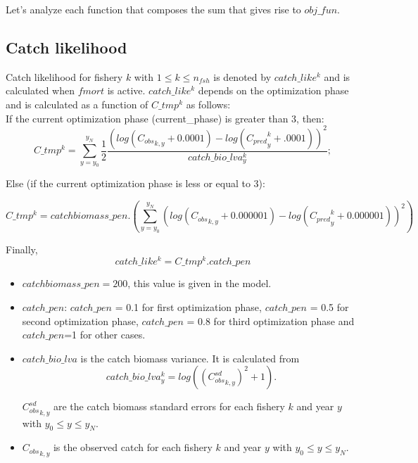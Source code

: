 \documentclass{article}
\begin{document}

Let's analyze each function that composes the sum that gives rise to $obj\_fun$.

\subsection{Catch likelihood}

Catch likelihood for fishery $k$  with  $1\leq k \leq n_{fsh}$ is denoted by $catch\_like^k$ and is calculated when $fmort$ is active.
$catch\_like^k$ depends on the optimization phase and is calculated as a function of  $C\_tmp^k$ as follows:\\

If the current optimization phase (current\_phase) is greater than 3, then:
\begin{equation}
  C\_tmp^k = \sum_{y=y_0}^{y_N}\dfrac{1}{2}\dfrac{(log({C_{obs}}_{k,y}+0.0001) - log({C_{pred}}^k_y+.0001) )^2}{catch\_bio\_lva^k_y};
\end{equation}
    
Else (if the current optimization phase is less or equal to 3):

\begin{equation}
 C\_tmp^k = catchbiomass\_pen.\left(\sum_{y=y_0}^{y_N}(log({C_{obs}}_{k,y} + 0.000001) - log({C_{pred}}^{k}_y + 0.000001))^2\right)
\end{equation}

Finally, 
\begin{equation}
 catch\_like^k = C\_tmp^k.catch\_pen 
\end{equation}
    
\begin{itemize}
  \item $catchbiomass\_pen=200$, this value is given in the model.
  \item $catch\_pen$: $catch\_pen$ = 0.1 for first optimization phase, $catch\_pen$ = 0.5 for second optimization phase, $catch\_pen$ = 0.8 for third optimization phase and $catch\_pen$=1 for other cases.
  \item $catch\_bio\_lva$ is the catch biomass variance. It is calculated from 
  \begin{equation*}
   catch\_bio\_lva^k_y=log(({C^{sd}_{obs}}_{k,y})^2+1).
  \end{equation*}

  ${C^{sd}_{obs}}_{k,y}$ are the catch biomass standard errors for each fishery $k$ and year $y$ with $y_0\leq y \leq y_N$.
  
  \item ${C_{obs}}_{k,y}$ is the observed catch for each fishery $k$ and year $y$ with $y_0 \leq y \leq y_N$.
\end{itemize}
\end{document}
